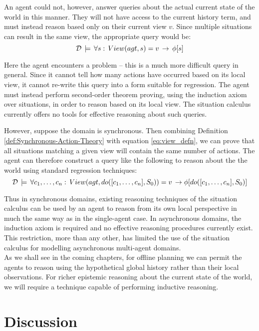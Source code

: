 An agent could not, however, answer queries about the actual current
state of the world in this manner. They will not have access to the
current history term, and must instead reason based only on their
current view $v$. Since multiple situations can result in the same
view, the appropriate query would be:\[
\mathcal{D}\,\models\,\forall s:\, View(agt,s)=v\,\rightarrow\,\phi[s]\]


Here the agent encounters a problem -- this is a much more difficult
query in general. Since it cannot tell how many actions have occurred
based on its local view, it cannot re-write this query into a form
suitable for regression. The agent must instead perform second-order
theorem proving, using the induction axiom over situations, in order
to reason based on its local view. The situation calculus currently
offers no tools for effective reasoning about such queries.

However, suppose the domain is synchronous. Then combining Definition
\ref{def:Synchronous-Action-Theory} with equation \eqref{eq:view_defn},
we can prove that all situations matching a given view will contain
the same number of actions. The agent can therefore construct a query
like the following to reason about the the world using standard regression
techniques:\[
\mathcal{D}\,\models\,\forall c_{1},\dots,c_{n}:\, View(agt,do([c_{1},\dots,c_{n}],S_{0}))=v\,\rightarrow\phi[do([c_{1},\dots,c_{n}],S_{0})]\]


Thus in synchronous domains, existing reasoning techniques of the
situation calculus can be used by an agent to reason from its own
local perspective in much the same way as in the single-agent case.
In asynchronous domains, the induction axiom is required and no effective
reasoning procedures currently exist. This restriction, more than
any other, has limited the use of the situation calculus for modelling
asynchronous multi-agent domains.\\


As we shall see in the coming chapters, for offline planning we can
permit the agents to reason using the hypothetical global history
rather than their local observations. For richer epistemic reasoning
about the current state of the world, we will require a technique
capable of performing inductive reasoning.\newpage{}


\section{Discussion\label{sec:Observations:Discussion}}

